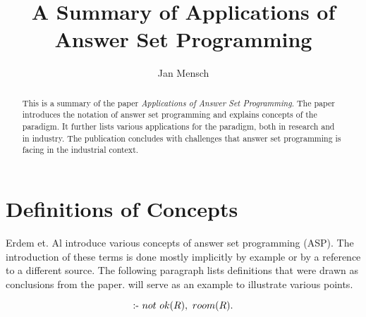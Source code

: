 \documentclass[runningheads]{llncs}
\newcommand{\papertitle}{Applications of Answer Set Programming}
\begin{document}
%
\title{A Summary of \papertitle}
%
%
\author{Jan Mensch}
%
%



%
\maketitle              %
%
\begin{abstract}
This is a summary of the paper \textit{\papertitle}. The paper introduces the notation of answer set programming and explains concepts of the paradigm. It further lists various applications for the paradigm, both in research and in industry. The publication concludes with challenges that answer set programming is facing in the industrial context. 



\end{abstract}
%
%
%

\section{Definitions of Concepts}

Erdem et. Al introduce various concepts of answer set programming (ASP). The introduction of these terms is done mostly implicitly by example or by a reference to a different source. The following paragraph lists definitions that were drawn as conclusions from the paper.  will serve as an example to illustrate various points. 


\begin{equation}
    \label{formulaexample}
\textrm{:-} ~ not ~ ok(R), ~ room(R).
\end{equation}
\end{document}
